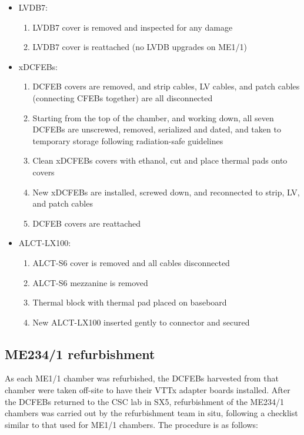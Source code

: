 \begin{itemize}
    \item LVDB7:
    \begin{enumerate}
        \item LVDB7 cover is removed and inspected for any damage
        \item LVDB7 cover is reattached (no LVDB upgrades on ME1/1)
    \end{enumerate}
    \item xDCFEBs:
    \begin{enumerate}
        \item DCFEB covers are removed, and strip cables, LV cables, and patch cables (connecting CFEBs together) are all disconnected
        \item Starting from the top of the chamber, and working down, all seven DCFEBs are unscrewed, removed, serialized and dated, and taken to temporary storage following radiation-safe guidelines
        \item Clean xDCFEBs covers with ethanol, cut and place thermal pads onto covers
        \item New xDCFEBs are installed, screwed down, and reconnected to strip, LV, and patch cables
        \item DCFEB covers are reattached
    \end{enumerate}
    \item ALCT-LX100:
    \begin{enumerate}
        \item ALCT-S6 cover is removed and all cables disconnected
        \item ALCT-S6 mezzanine is removed
        \item Thermal block with thermal pad placed on baseboard
        \item New ALCT-LX100 inserted gently to connector and secured
    \end{enumerate}
\end{itemize}

\subsection{ME234/1 refurbishment} \label{sec:ME234/1refurbishment}

As each ME1/1 chamber was refurbished, the DCFEBs harvested from that chamber were taken off-site to have their VTTx adapter boards installed. After the DCFEBs returned to the CSC lab in SX5, refurbishment of the ME234/1 chambers was carried out by the refurbishment team in situ, following a checklist similar to that used for ME1/1 chambers. The procedure is as follows: 

